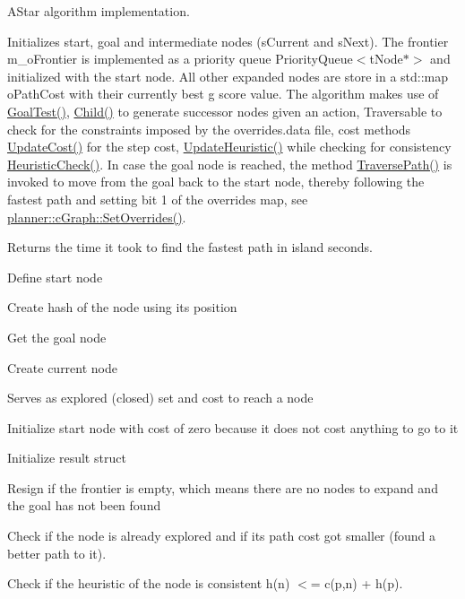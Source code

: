 A\+Star algorithm implementation. 

Initializes start, goal and intermediate nodes (s\+Current and s\+Next). The frontier m\+\_\+o\+Frontier is implemented as a priority queue Priority\+Queue$<$t\+Node$\ast$$>$ and initialized with the start node. All other expanded nodes are store in a std\+::map o\+Path\+Cost with their currently best g score value. The algorithm makes use of \mbox{\hyperlink{classplanner_1_1c_planner_a6b7554394efd7ad10d76a49b370aa62f}{Goal\+Test()}}, \mbox{\hyperlink{classplanner_1_1c_planner_adbffc6ce05119c940a09369d7e61554e}{Child()}} to generate successor nodes given an action, Traversable to check for the constraints imposed by the overrides.\+data file, cost methods \mbox{\hyperlink{classplanner_1_1c_planner_a16e8c156297fff49a6ba9b97073baffb}{Update\+Cost()}} for the step cost, \mbox{\hyperlink{classplanner_1_1c_planner_ab7cc7c2666de2e49f745901080aac147}{Update\+Heuristic()}} while checking for consistency \mbox{\hyperlink{classplanner_1_1c_planner_a1234d075676fcaa2c17b859d11b4638c}{Heuristic\+Check()}}. In case the goal node is reached, the method \mbox{\hyperlink{classplanner_1_1c_planner_a8624cb2afb8f2fd216c38b4424013178}{Traverse\+Path()}} is invoked to move from the goal back to the start node, thereby following the fastest path and setting bit 1 of the overrides map, see \mbox{\hyperlink{classplanner_1_1c_graph_a6da6e6e269013628aef48245a7787cb9}{planner\+::c\+Graph\+::\+Set\+Overrides()}}. \begin{DoxyReturn}{Returns}
the time it took to find the fastest path in island seconds. 
\end{DoxyReturn}
Define start node

Create hash of the node using its position

Get the goal node

Create current node

Serves as explored (closed) set and cost to reach a node

Initialize start node with cost of zero because it does not cost anything to go to it

Initialize result struct

Resign if the frontier is empty, which means there are no nodes to expand and the goal has not been found

Check if the node is already explored and if its path cost got smaller (found a better path to it).

Check if the heuristic of the node is consistent h(n) $<$= c(p,n) + h(p).

